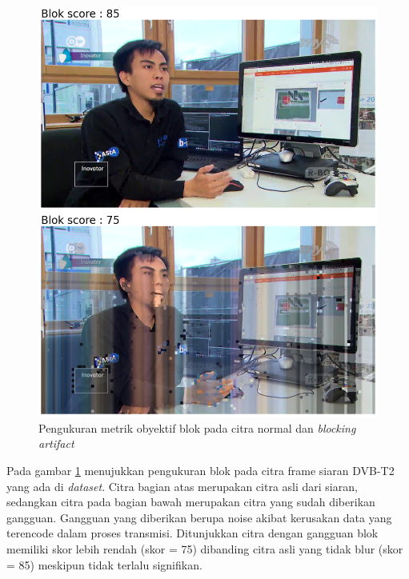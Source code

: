 \begin{figure}[H]
	\vspace{-0.1cm}
	\begin{center}
		\includegraphics[width=0.8\columnwidth]{bab4/Gambar/blok-score.png}
	\end{center}
	\vspace{-0.2cm}
	\caption{Pengukuran metrik obyektif  blok pada citra normal dan \textit{blocking artifact}}
	\label{blok-score}
\end{figure}

Pada gambar \ref{blok-score} menujukkan pengukuran blok pada citra frame siaran DVB-T2 yang ada di \textit{dataset}. Citra bagian atas merupakan citra asli dari siaran, sedangkan citra pada bagian bawah merupakan citra yang sudah diberikan gangguan. Gangguan yang diberikan berupa noise akibat kerusakan data yang terencode dalam proses transmisi. Ditunjukkan citra dengan gangguan blok memiliki skor lebih rendah (skor = 75) dibanding citra asli yang tidak blur (skor = 85) meskipun tidak terlalu signifikan.



